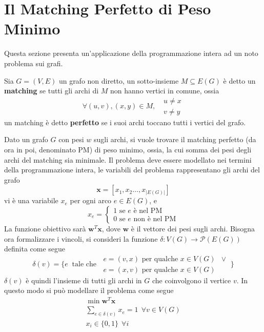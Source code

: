 \documentclass[10pt, letterpaper]{report}
\newcommand{\x}{{\mathbf{x}}}
\begin{document}
\section{Il Matching Perfetto di Peso Minimo}
Questa sezione presenta un'applicazione della programmazione intera ad un noto problema sui grafi.\begin{definizione}
    Sia $G=(V,E)$ un grafo non diretto, un sotto-insieme $M\subseteq E(G)$ è detto un \textbf{matching} se tutti gli archi di $M$ non hanno vertici in comune, ossia $$\forall (u,v),(x,y)\in M, \ \  \ \begin{matrix}
        u\ne x\\
        v\ne y 
    \end{matrix} $$
    un matching è detto \textbf{perfetto} se i suoi archi toccano tutti i vertici del grafo.
\end{definizione}
Dato un grafo $G$ con pesi $w$ sugli archi, si vuole trovare il matching perfetto (da ora in poi, denominato PM) di peso minimo, ossia, la cui somma dei pesi degli archi del matching sia minimale. Il problema deve essere modellato nei termini della programmazione intera, le variabili del problema rappresentano gli archi del grafo $$ \x=[x_1,x_2\dots, x_{|E(G)|}]$$
vi è una variabile $x_e$ per ogni arco $e\in E(G)$, e $$ x_e=\begin{cases}
    1 \text{ se } e \text{ è nel PM}\\
    0 \text{ se } e \text{ non è nel PM}
\end{cases}$$
La funzione obiettivo sarà $\mathbf w^T\mathbf x$, dove $\mathbf w$ è il vettore dei pesi sugli archi. Bisogna ora formalizzare i vincoli, si consideri la funzione $\delta:V(G)\rightarrow\mathcal P(E(G))$ definita come segue 
$$ \delta(v)=\Big\{e \ \text{ tale che } \ \begin{matrix}
e=(v,x) \text{ per qualche }x\in V(G) & \lor\\
e=(x,v) \text{ per qualche }x\in V(G)&
\end{matrix} \ \Big\}$$
$\delta(v)$ è quindi l'insieme di tutti gli archi in $G$ che coinvolgono il vertice $v$. In questo modo si può modellare il problema come segue
\begin{equation}\label{PM_min}
\begin{matrix}
    \min \mathbf w^T\mathbf x\\ \displaystyle
    \sum_{e\in\delta(v)}x_e=1 \ \ \forall v\in V(G)\\ 
    x_i\in\{0,1\} \ \ \forall i
\end{matrix}
\end{equation}
\end{document}
